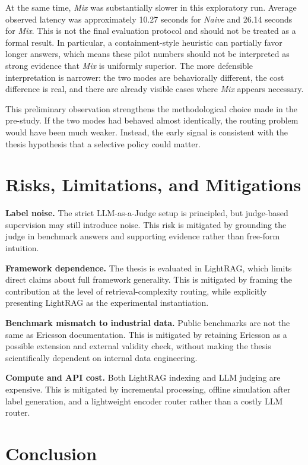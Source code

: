 \documentclass[11pt, a4paper]{article}
\begin{document}
At the same time, \emph{Mix} was substantially slower in this exploratory run. Average observed latency was approximately 10.27 seconds for \emph{Naive} and 26.14 seconds for \emph{Mix}. This is not the final evaluation protocol and should not be treated as a formal result. In particular, a containment-style heuristic can partially favor longer answers, which means these pilot numbers should not be interpreted as strong evidence that \emph{Mix} is uniformly superior. The more defensible interpretation is narrower: the two modes are behaviorally different, the cost difference is real, and there are already visible cases where \emph{Mix} appears necessary.

This preliminary observation strengthens the methodological choice made in the pre-study. If the two modes had behaved almost identically, the routing problem would have been much weaker. Instead, the early signal is consistent with the thesis hypothesis that a selective policy could matter.

\section{Risks, Limitations, and Mitigations}

\textbf{Label noise.} The strict LLM-as-a-Judge setup is principled, but judge-based supervision may still introduce noise. This risk is mitigated by grounding the judge in benchmark answers and supporting evidence rather than free-form intuition.

\textbf{Framework dependence.} The thesis is evaluated in LightRAG, which limits direct claims about full framework generality. This is mitigated by framing the contribution at the level of retrieval-complexity routing, while explicitly presenting LightRAG as the experimental instantiation.

\textbf{Benchmark mismatch to industrial data.} Public benchmarks are not the same as Ericsson documentation. This is mitigated by retaining Ericsson as a possible extension and external validity check, without making the thesis scientifically dependent on internal data engineering.

\textbf{Compute and API cost.} Both LightRAG indexing and LLM judging are expensive. This is mitigated by incremental processing, offline simulation after label generation, and a lightweight encoder router rather than a costly LLM router.

\section{Conclusion}
\end{document}
